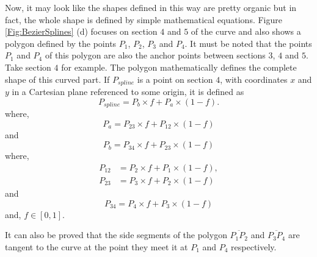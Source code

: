         Now, it may look like the shapes defined in this way are pretty organic but in fact, the whole shape is defined by simple mathematical equations. Figure \ref{Fig:BezierSplines} (d) focuses on section $4$ and $5$ of the curve and also shows a polygon defined by the points $P_1$, $P_2$, $P_3$ and  $P_4$. It must be noted that the points $P_1$ and $P_4$ of this polygon are also the anchor points between sections $3$, $4$ and $5$. Take section $4$ for example. The polygon mathematically defines the complete shape of this curved part. If $P_{spline}$ is a point on section $4$, with coordinates $x$ and $y$ in a Cartesian plane referenced to some origin, it is defined as
         \begin{equation}
         \label{splineModel01}
         P_{spline}=P_b×f+P_a×(1 -f).
         \end{equation}
where,
\begin{equation}
\label{splineModel02}
P_a=P_{23}×f+P_{12}×(1 -f)
\end{equation}
and
\begin{equation}
\label{splineModel03}
P_b=P_{34}×f+P_{23}×(1 -f)
\end{equation}
where,
\begin{align}
P_{12}&=P_2×f+P_1×(1 -f), \\
P_{23}&=P_3×f+P_2×(1 -f)
\end{align}
and
\begin{equation}
\label{splineModel04}
P_{34}=P_4×f+P_3×(1 -f)
\end{equation}
and, $f \in [0, 1]$.

It can also be proved that the side segments of the polygon $\overline{P_1 P_2}$ and $\overline{P_3 P_4}$ are tangent to the curve at the point they meet it at $P_1$ and $P_4$ respectively.


